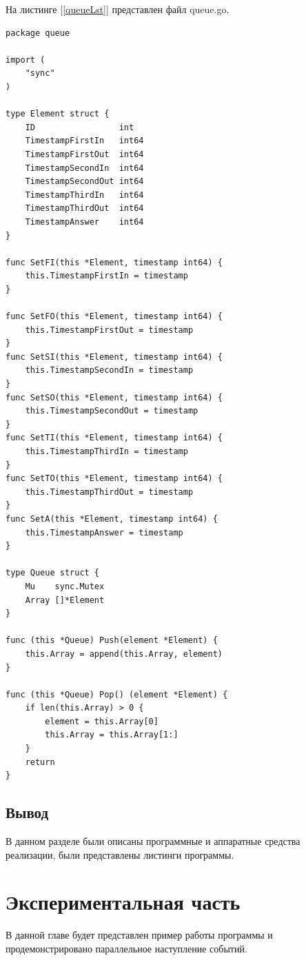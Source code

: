 \documentclass{article}
\begin{document}
		На листинге \hyperref[queueLst]{[\ref{queueLst}]} представлен файл queue.go.
	\begin{lstlisting}[label=queueLst,caption=queue.go]
package queue

import (
	"sync"
)

type Element struct {
	ID                 int
	TimestampFirstIn   int64
	TimestampFirstOut  int64
	TimestampSecondIn  int64
	TimestampSecondOut int64
	TimestampThirdIn   int64
	TimestampThirdOut  int64
	TimestampAnswer    int64
}

func SetFI(this *Element, timestamp int64) {
	this.TimestampFirstIn = timestamp
}

func SetFO(this *Element, timestamp int64) {
	this.TimestampFirstOut = timestamp
}
func SetSI(this *Element, timestamp int64) {
	this.TimestampSecondIn = timestamp
}
func SetSO(this *Element, timestamp int64) {
	this.TimestampSecondOut = timestamp
}
func SetTI(this *Element, timestamp int64) {
	this.TimestampThirdIn = timestamp
}
func SetTO(this *Element, timestamp int64) {
	this.TimestampThirdOut = timestamp
}
func SetA(this *Element, timestamp int64) {
	this.TimestampAnswer = timestamp
}

type Queue struct {
	Mu    sync.Mutex
	Array []*Element
}

func (this *Queue) Push(element *Element) {
	this.Array = append(this.Array, element)
}

func (this *Queue) Pop() (element *Element) {
	if len(this.Array) > 0 {
		element = this.Array[0]
		this.Array = this.Array[1:]
	}
	return
}

	\end{lstlisting}
	\subsection{Вывод}
	В данном разделе были описаны программные и аппаратные средства реализации, были представлены листинги программы.

	\newpage
	\section{Экспериментальная часть}
	В данной главе будет представлен пример работы программы и продемонстрировано параллельное наступление событий.
\end{document}
